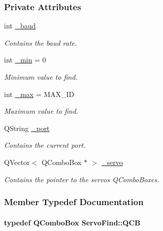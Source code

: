 \subsubsection*{Private Attributes}
\begin{DoxyCompactItemize}
\item 
int \hyperlink{a00008_ad2f3b1ab924ff2051178eb981d030b66}{\+\_\+baud}
\begin{DoxyCompactList}\small\item\em Contains the baud rate. \end{DoxyCompactList}\item 
int \hyperlink{a00008_a65a3d5606c9a8bcd6ace9be36c3551e1}{\+\_\+min} = 0
\begin{DoxyCompactList}\small\item\em Minimum value to find. \end{DoxyCompactList}\item 
int \hyperlink{a00008_abb4bcc300ab0a9c1df3c41b4e7d1fe2d}{\+\_\+max} = M\+A\+X\+\_\+\+I\+D
\begin{DoxyCompactList}\small\item\em Maximum value to find. \end{DoxyCompactList}\item 
Q\+String \hyperlink{a00008_acc6d9f94a8cf7a7a777fd9c818d98207}{\+\_\+port}
\begin{DoxyCompactList}\small\item\em Contains the current port. \end{DoxyCompactList}\item 
Q\+Vector$<$ Q\+Combo\+Box $\ast$ $>$ \hyperlink{a00008_a571ee1fc45255666e5baa0d5e9111551}{\+\_\+servo}
\begin{DoxyCompactList}\small\item\em Contains the pointer to the servos Q\+Combo\+Boxes. \end{DoxyCompactList}\end{DoxyCompactItemize}


\subsubsection{Member Typedef Documentation}
\hypertarget{a00008_a8cfdbef4d4dc51f1b200a885ff827711}{}
\paragraph[{Q\+C\+B}]{\setlength{\rightskip}{0pt plus 5cm}typedef Q\+Combo\+Box {\bf Servo\+Find\+::\+Q\+C\+B}\hspace{0.3cm}{\ttfamily [private]}}\label{a00008_a8cfdbef4d4dc51f1b200a885ff827711}


